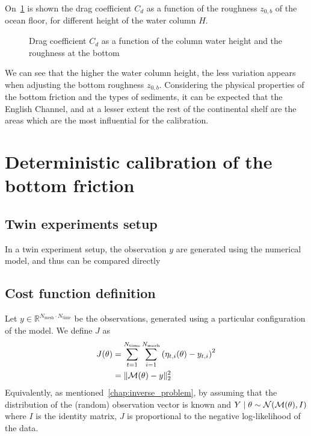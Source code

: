 \documentclass[../../Main_ManuscritThese.tex]{subfiles}
\newcommand{\zob}{z_{0,b}}
\newcommand\imgpath{/home/victor/acadwriting/Manuscrit/Text/Chapter5/img/}
\begin{document}
On~\cref{fig:cd_zob} is shown the drag coefficient $C_d$ as a function
of the roughness $\zob$ of the ocean floor, for different height of
the water column $H$.
\begin{figure}[ht]
  \centering 
  \caption{\label{fig:cd_zob} Drag coefficient $C_d$ as a function of the column water height and the roughness at the bottom}
\end{figure}
We can see that the higher the water column height, the less
variation appears when adjusting the bottom roughness $\zob$.
Considering the physical properties of the bottom friction and the
types of sediments, it can be expected that the English Channel, and at a lesser extent the rest of the continental shelf
are the areas which are the most influential for the calibration.


\section{Deterministic calibration of the bottom friction}
\label{sec:deterministic_calibration_bott}
\subsection{Twin experiments setup}
In a twin experiment setup, the observation $y$ are generated using
the numerical model, and thus can be compared directly 
\subsection{Cost function definition}
Let $y \in \mathbb{R}^{N_{\mathrm{mesh}} \cdot N_{\mathrm{time}}}$ be
the observations, generated using a particular configuration of the
model.
We define $J$ as
\begin{align}
  J(\theta) &= \sum_{t=1}^{ N_{\mathrm{time}}}\sum_{i=1}^{N_{\mathrm{mesh}}}  \left(\eta_{t,i}(\theta) - y_{t, i}\right)^2 \\
         &= \|\mathcal{M}(\theta) - y\|_2^2
\end{align}
Equivalently, as mentioned~\cref{chap:inverse_problem}, by assuming
that the distribution of the (random) observation vector is known and
$Y \mid \theta \sim \mathcal{N}(\mathcal{M}(\theta), I)$ where $I$ is the
identity matrix, $J$ is proportional to the negative log-likelihood of the data.
\end{document}
